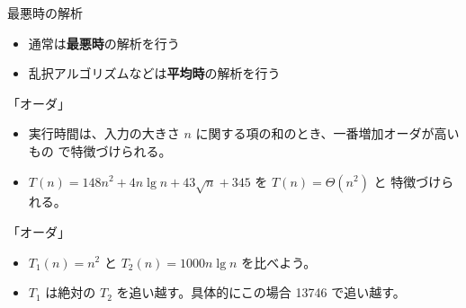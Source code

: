 \documentclass[unicode,12pt,aspectratio=169,notes]{beamer} %
\begin{document}
\begin{frame}{最悪時の解析}
  \begin{itemize}
    \item 通常は\textbf{最悪時}の解析を行う
    \item 乱択アルゴリズムなどは\textbf{平均時}の解析を行う
  \end{itemize}
\end{frame}


\begin{frame}{「オーダ」}
  \begin{itemize}
    \item 実行時間は、入力の大きさ $n$ に関する項の和のとき、一番増加オーダが高いもの
    で特徴づけられる。
    \item $T(n) = 148n^2 + 4n\lg n + 43\sqrt{n} + 345$ を $T(n) = \Theta(n^2)$ と
    特徴づけられる。
  \end{itemize}
\end{frame}


\begin{frame}{「オーダ」}
  \begin{itemize}
    \item<1-> $T_1(n) = n^2$ と $T_2(n) = 1000n\lg n$ を比べよう。
    \item<2-> $T_1$ は絶対の $T_2$ を追い越す。具体的にこの場合 13746 で追い越す。
  \end{itemize}
\end{frame}

\end{document}
